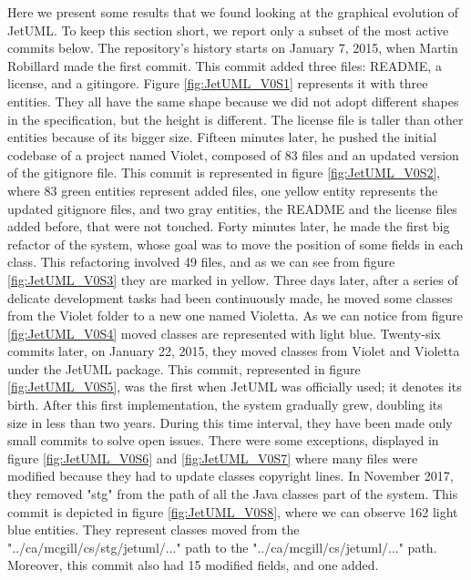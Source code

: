 Here we present some results that we found looking at the graphical evolution of JetUML. 
To keep this section short, we report only a subset of the most active commits below. 
\bigbreak
The repository's history starts on January 7, 2015, when Martin Robillard made the first commit. 
This commit added three files: README, a license, and a gitingore. 
Figure \ref{fig:JetUML_V0S1} represents it with three entities. They all have the same shape because we did not adopt different shapes in the specification, but the height is different. The license file is taller than other entities because of its bigger size. 
\bigbreak
Fifteen minutes later, he pushed the initial codebase of a project named Violet, composed of 83 files and an updated version of the gitignore file. This commit is represented in figure \ref{fig:JetUML_V0S2}, where 83 green entities represent added files, one yellow entity represents the updated gitignore files, and two gray entities, the README and the license files added before, that were not touched.
\bigbreak
Forty minutes later, he made the first big refactor of the system, whose goal was to move the position of some fields in each class. This refactoring involved 49 files, and as we can see from figure \ref{fig:JetUML_V0S3} they are marked in yellow. 
\bigbreak
Three days later, after a series of delicate development tasks had been continuously made, he moved some classes from the Violet folder to a new one named Violetta. As we can notice from figure \ref{fig:JetUML_V0S4} moved classes are represented with light blue. 
\bigbreak
Twenty-six commits later, on January 22, 2015, they moved classes from Violet and Violetta under the JetUML package. This commit, represented in figure \ref{fig:JetUML_V0S5}, was the first when JetUML was officially used; it denotes its birth. 
\bigbreak
After this first implementation, the system gradually grew, doubling its size in less than two years. 
During this time interval, they have been made only small commits to solve open issues. There were some exceptions, displayed in figure \ref{fig:JetUML_V0S6} and \ref{fig:JetUML_V0S7} where many files were modified because they had to update classes copyright lines. 
\bigbreak
In November 2017, they removed "stg" from the path of all the Java classes part of the system. This commit is depicted in figure \ref{fig:JetUML_V0S8}, where we can observe 162 light blue entities. They represent classes moved from the "../ca/mcgill/cs/stg/jetuml/..." path to the 
"../ca/mcgill/cs/jetuml/..." path. Moreover, this commit also had 15 modified fields, and one added. 
\bigbreak
